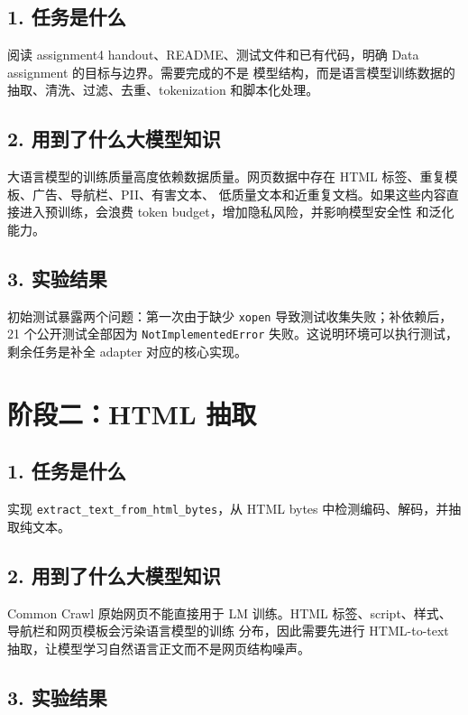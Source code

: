 \documentclass[UTF8,11pt]{ctexart}
\begin{document}
\subsection*{1. 任务是什么}

阅读 assignment4 handout、README、测试文件和已有代码，明确 Data assignment 的目标与边界。需要完成的不是
模型结构，而是语言模型训练数据的抽取、清洗、过滤、去重、tokenization 和脚本化处理。

\subsection*{2. 用到了什么大模型知识}

大语言模型的训练质量高度依赖数据质量。网页数据中存在 HTML 标签、重复模板、广告、导航栏、PII、有害文本、
低质量文本和近重复文档。如果这些内容直接进入预训练，会浪费 token budget，增加隐私风险，并影响模型安全性
和泛化能力。

\subsection*{3. 实验结果}

初始测试暴露两个问题：第一次由于缺少 \texttt{xopen} 导致测试收集失败；补依赖后，21 个公开测试全部因为
\texttt{NotImplementedError} 失败。这说明环境可以执行测试，剩余任务是补全 adapter 对应的核心实现。

\section{阶段二：HTML 抽取}

\subsection*{1. 任务是什么}

实现 \texttt{extract\_text\_from\_html\_bytes}，从 HTML bytes 中检测编码、解码，并抽取纯文本。

\subsection*{2. 用到了什么大模型知识}

Common Crawl 原始网页不能直接用于 LM 训练。HTML 标签、script、样式、导航栏和网页模板会污染语言模型的训练
分布，因此需要先进行 HTML-to-text 抽取，让模型学习自然语言正文而不是网页结构噪声。

\subsection*{3. 实验结果}
\end{document}

